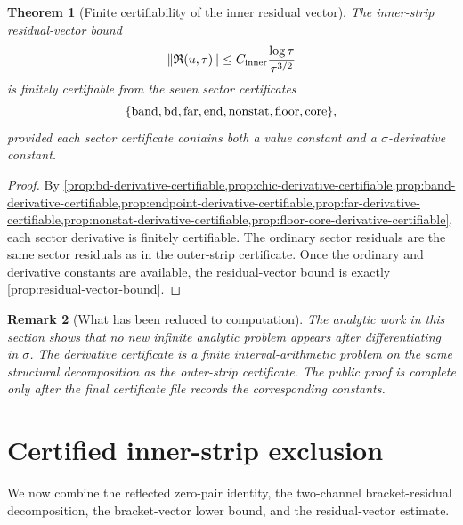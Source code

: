 \documentclass[11pt]{article}
\newtheorem{theorem}{Theorem}[section]
\newtheorem{remark}[theorem]{Remark}
\newcommand{\Rvec}{\mathfrak R}
\newcommand{\Cinner}{C_{\rm inner}}
\begin{document}
\begin{theorem}[Finite certifiability of the inner residual vector]
\label{thm:finite-certifiability-inner-residual}
The inner-strip residual-vector bound
\[
        \|\Rvec(u,\tau)\|
        \le
        \Cinner
        \frac{\log\tau}{\tau^{3/2}}
\]
is finitely certifiable from the seven sector certificates
\[
        \{
        {\rm band},
        {\rm bd},
        {\rm far},
        {\rm end},
        {\rm nonstat},
        {\rm floor},
        {\rm core}
        \},
\]
provided each sector certificate contains both a value constant and a
\(\sigma\)-derivative constant.
\end{theorem}

\begin{proof}
By
\cref{prop:bd-derivative-certifiable,prop:chic-derivative-certifiable,prop:band-derivative-certifiable,prop:endpoint-derivative-certifiable,prop:far-derivative-certifiable,prop:nonstat-derivative-certifiable,prop:floor-core-derivative-certifiable},
each sector derivative is finitely certifiable.  The ordinary sector residuals
are the same sector residuals as in the outer-strip certificate.  Once the
ordinary and derivative constants are available, the residual-vector bound is
exactly \cref{prop:residual-vector-bound}.
\end{proof}

\begin{remark}[What has been reduced to computation]
The analytic work in this section shows that no new infinite analytic problem
appears after differentiating in \(\sigma\).  The derivative certificate is a
finite interval-arithmetic problem on the same structural decomposition as the
outer-strip certificate.  The public proof is complete only after the final
certificate file records the corresponding constants.
\end{remark}




\section{Certified inner-strip exclusion}
\label{sec:inner-exclusion}

We now combine the reflected zero-pair identity, the two-channel
bracket-residual decomposition, the bracket-vector lower bound, and the
residual-vector estimate.
\end{document}
